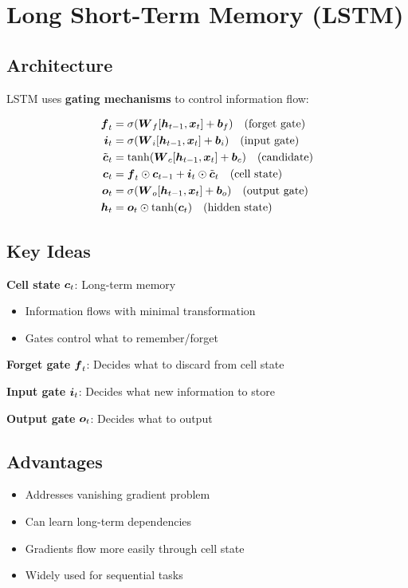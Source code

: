 
\section{Long Short-Term Memory (LSTM)}
\label{sec:lstm}

\subsection{Architecture}

LSTM uses \textbf{gating mechanisms} to control information flow:

\begin{align}
\boldsymbol{f}_t &= \sigma(\boldsymbol{W}_f [\boldsymbol{h}_{t-1}, \boldsymbol{x}_t] + \boldsymbol{b}_f) \quad \text{(forget gate)} \\
\boldsymbol{i}_t &= \sigma(\boldsymbol{W}_i [\boldsymbol{h}_{t-1}, \boldsymbol{x}_t] + \boldsymbol{b}_i) \quad \text{(input gate)} \\
\tilde{\boldsymbol{c}}_t &= \tanh(\boldsymbol{W}_c [\boldsymbol{h}_{t-1}, \boldsymbol{x}_t] + \boldsymbol{b}_c) \quad \text{(candidate)} \\
\boldsymbol{c}_t &= \boldsymbol{f}_t \odot \boldsymbol{c}_{t-1} + \boldsymbol{i}_t \odot \tilde{\boldsymbol{c}}_t \quad \text{(cell state)} \\
\boldsymbol{o}_t &= \sigma(\boldsymbol{W}_o [\boldsymbol{h}_{t-1}, \boldsymbol{x}_t] + \boldsymbol{b}_o) \quad \text{(output gate)} \\
\boldsymbol{h}_t &= \boldsymbol{o}_t \odot \tanh(\boldsymbol{c}_t) \quad \text{(hidden state)}
\end{align}

\subsection{Key Ideas}

\textbf{Cell state} $\boldsymbol{c}_t$: Long-term memory
\begin{itemize}
    \item Information flows with minimal transformation
    \item Gates control what to remember/forget
\end{itemize}

\textbf{Forget gate} $\boldsymbol{f}_t$: Decides what to discard from cell state

\textbf{Input gate} $\boldsymbol{i}_t$: Decides what new information to store

\textbf{Output gate} $\boldsymbol{o}_t$: Decides what to output

\subsection{Advantages}

\begin{itemize}
    \item Addresses vanishing gradient problem
    \item Can learn long-term dependencies
    \item Gradients flow more easily through cell state
    \item Widely used for sequential tasks
\end{itemize}

